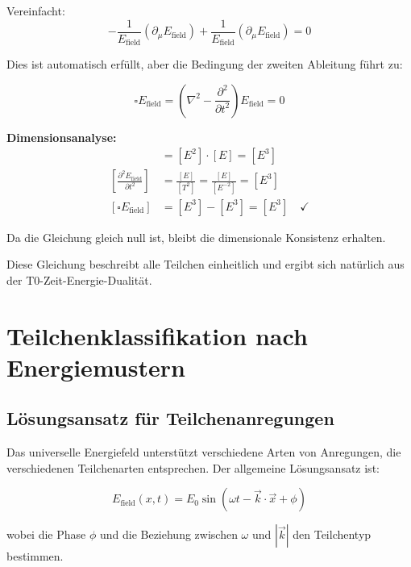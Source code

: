 \documentclass[12pt,a4paper]{report}
\begin{document}
	Vereinfacht:
	\begin{equation}
		-\frac{1}{E_{\text{field}}} (\partial_\mu E_{\text{field}}) + \frac{1}{E_{\text{field}}} (\partial_\mu E_{\text{field}}) = 0
	\end{equation}
	
	Dies ist automatisch erfüllt, aber die Bedingung der zweiten Ableitung führt zu:
	
	\begin{equation}
		\boxed{\square E_{\text{field}} = \left(\nabla^2 - \frac{\partial^2}{\partial t^2}\right) E_{\text{field}} = 0}
		\label{eq:universal_wave_equation}
	\end{equation}
	
	\textbf{Dimensionsanalyse:}
	\begin{align}
		[\nabla^2 E_{\text{field}}] &= [E^2] \cdot [E] = [E^3] \\
		\left[\frac{\partial^2 E_{\text{field}}}{\partial t^2}\right] &= \frac{[E]}{[T^2]} = \frac{[E]}{[E^{-2}]} = [E^3] \\
		[\square E_{\text{field}}] &= [E^3] - [E^3] = [E^3] \quad \checkmark
	\end{align}
	
	Da die Gleichung gleich null ist, bleibt die dimensionale Konsistenz erhalten.
	
	Diese Gleichung beschreibt alle Teilchen einheitlich und ergibt sich natürlich aus der T0-Zeit-Energie-Dualität.
	
	\section{Teilchenklassifikation nach Energiemustern}
	\label{sec:particle_classification}
	
	\subsection{Lösungsansatz für Teilchenanregungen}
	\label{subsec:solution_ansatz}
	
	Das universelle Energiefeld unterstützt verschiedene Arten von Anregungen, die verschiedenen Teilchenarten entsprechen. Der allgemeine Lösungsansatz ist:
	
	\begin{equation}
		E_{\text{field}}(x,t) = E_0 \sin(\omega t - \vec{k} \cdot \vec{x} + \phi)
	\end{equation}
	
	wobei die Phase $\phi$ und die Beziehung zwischen $\omega$ und $|\vec{k}|$ den Teilchentyp bestimmen.
	
\end{document}
